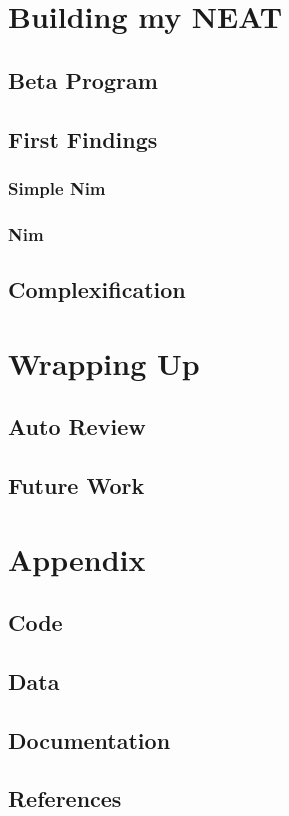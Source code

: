 \documentclass[11pt, a4paper, notitlepage]{report}
\begin{document}
    \chapter{Building my NEAT}
        \section{Beta Program}
        \section{First Findings}
            \subsection{Simple Nim}
            \subsection{Nim}
        \section{Complexification}
    \chapter{Wrapping Up}
        \section{Auto Review}
        \section{Future Work}
    \chapter{Appendix}
        \section{Code}
        \section{Data}
        \section{Documentation}
        \section{References}
\end{document}

